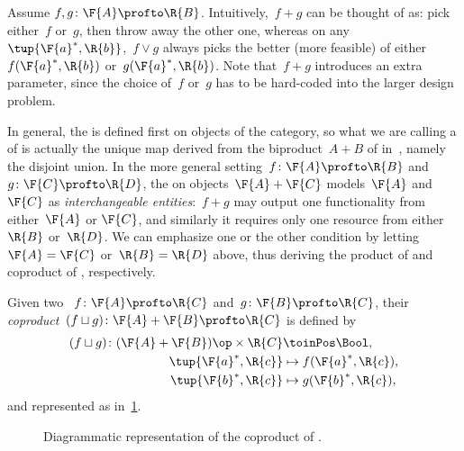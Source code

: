 Assume $f,g \colon \F{A} \profto \R{B}$.
Intuitively,~$f+g$ can be thought of as: pick either~$f$ or~$g$, then throw away the other one, whereas on any~$\tup{\F{a}^*,\R{b}}$,~$f \vee g$ always picks the better (more feasible) of either~$f(\F{a}^*,\R{b})$ or~$g(\F{a}^*,\R{b})$.
Note that~$f+g$ introduces an extra parameter, since the choice of~$f$ or~$g$ has to be hard-coded into the larger design problem.

In general, the  is defined first on objects of the category, so what we are calling a  of  is actually the unique map derived from the biproduct~$A + B$ of  in~\DP, namely the disjoint union.
In the more general setting~$f\colon \F{A} \profto \R{B}$ and~$g \colon \F{C} \profto \R{D}$, the  on objects~$\F{A} + \F{C}$ models~$\F{A}$ and $\F{C}$ as \emph{interchangeable entities}:~$f+g$ may output one functionality from either~$\F{A}$ or $\F{C}$, and similarly it requires only one resource from either~$\R{B}$ or~$\R{D}$.
We can emphasize one or the other condition by letting~$\F{A} = \F{C}$ or~$\R{B} =\R{D}$ above, thus deriving the product of  and coproduct of , respectively.

\begin{definition}
    \label{def:coproduct}
    Given two ~$f\colon \F{A} \profto \R{C}$ and~$g \colon \F{B} \profto \R{C}$, their \emph{coproduct}~$(f \sqcup g)\colon \F{A} + \F{B} \profto \R{C}$ is defined by
    \begin{equation}
        \begin{aligned}
            (f \sqcup g)
            \colon (\F{A} + \F{B})\op \times \R{C} & \toinPos \Bool, \\
            \tup{\F{a}^*, \R{c}}                   & \mapsto f(\F{a}^*, \R{c}), \\
            \tup{\F{b}^*, \R{c}}                   & \mapsto g(\F{b}^*, \R{c}),
        \end{aligned}
    \end{equation}
    and represented as in~\cref{fig:coproductdp}.
\end{definition}

\begin{figure}[h!]
    \begin{center}
    \end{center}
    \caption{Diagrammatic representation of the coproduct of . }
    \label{fig:coproductdp}
\end{figure}

